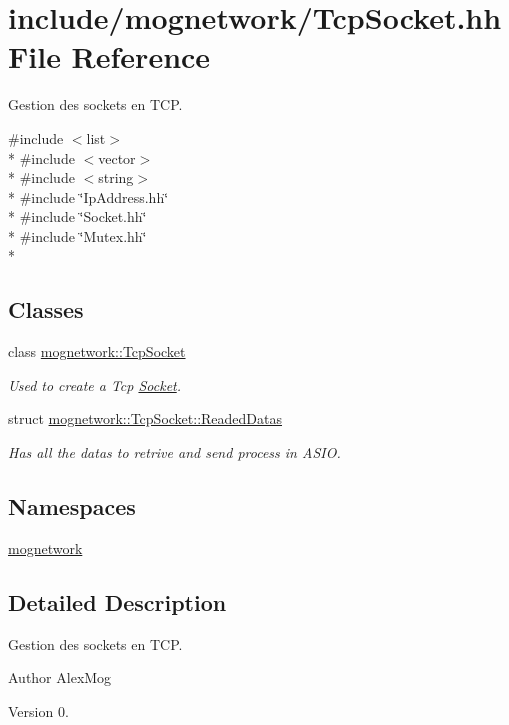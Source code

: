 \hypertarget{_tcp_socket_8hh}{\section{include/mognetwork/\-Tcp\-Socket.hh File Reference}
\label{_tcp_socket_8hh}
}


Gestion des sockets en T\-C\-P.  


{\ttfamily \#include $<$list$>$}\\*
{\ttfamily \#include $<$vector$>$}\\*
{\ttfamily \#include $<$string$>$}\\*
{\ttfamily \#include \char`\"{}Ip\-Address.\-hh\char`\"{}}\\*
{\ttfamily \#include \char`\"{}Socket.\-hh\char`\"{}}\\*
{\ttfamily \#include \char`\"{}Mutex.\-hh\char`\"{}}\\*
\subsection*{Classes}
\begin{DoxyCompactItemize}
\item 
class \hyperlink{classmognetwork_1_1_tcp_socket}{mognetwork\-::\-Tcp\-Socket}
\begin{DoxyCompactList}\small\item\em Used to create a Tcp \hyperlink{classmognetwork_1_1_socket}{Socket}. \end{DoxyCompactList}\item 
struct \hyperlink{structmognetwork_1_1_tcp_socket_1_1_readed_datas}{mognetwork\-::\-Tcp\-Socket\-::\-Readed\-Datas}
\begin{DoxyCompactList}\small\item\em Has all the datas to retrive and send process in A\-S\-I\-O. \end{DoxyCompactList}\end{DoxyCompactItemize}
\subsection*{Namespaces}
\begin{DoxyCompactItemize}
\item 
\hyperlink{namespacemognetwork}{mognetwork}
\end{DoxyCompactItemize}


\subsection{Detailed Description}
Gestion des sockets en T\-C\-P. \begin{DoxyAuthor}{Author}
Alex\-Mog 
\end{DoxyAuthor}
\begin{DoxyVersion}{Version}
0. 
\end{DoxyVersion}
